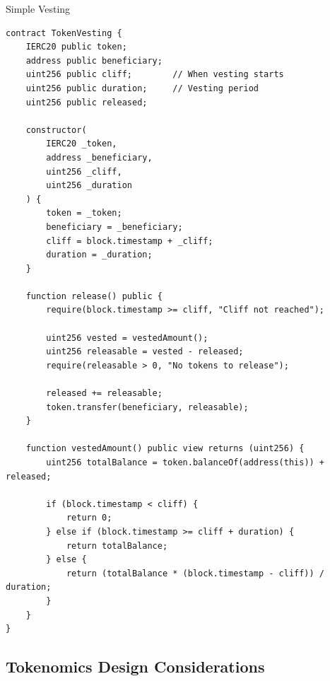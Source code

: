\documentclass[11pt,a4paper]{article}
\begin{document}
\begin{examplebox}{Simple Vesting}
\begin{lstlisting}[language=Solidity]
contract TokenVesting {
    IERC20 public token;
    address public beneficiary;
    uint256 public cliff;        // When vesting starts
    uint256 public duration;     // Vesting period
    uint256 public released;

    constructor(
        IERC20 _token,
        address _beneficiary,
        uint256 _cliff,
        uint256 _duration
    ) {
        token = _token;
        beneficiary = _beneficiary;
        cliff = block.timestamp + _cliff;
        duration = _duration;
    }

    function release() public {
        require(block.timestamp >= cliff, "Cliff not reached");

        uint256 vested = vestedAmount();
        uint256 releasable = vested - released;
        require(releasable > 0, "No tokens to release");

        released += releasable;
        token.transfer(beneficiary, releasable);
    }

    function vestedAmount() public view returns (uint256) {
        uint256 totalBalance = token.balanceOf(address(this)) + released;

        if (block.timestamp < cliff) {
            return 0;
        } else if (block.timestamp >= cliff + duration) {
            return totalBalance;
        } else {
            return (totalBalance * (block.timestamp - cliff)) / duration;
        }
    }
}
\end{lstlisting}
\end{examplebox}

\subsection{Tokenomics Design Considerations}
\end{document}
